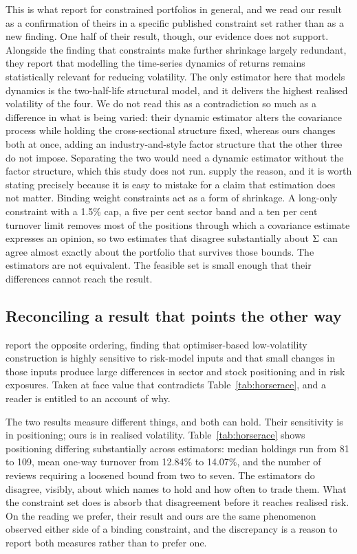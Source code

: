 This is what \citet{dom2025beyond} report for constrained portfolios in
general, and we read our result as a confirmation of theirs in a specific
published constraint set rather than as a new finding. One half of their
result, though, our evidence does not support. Alongside the finding that
constraints make further shrinkage largely redundant, they report that
modelling the time-series dynamics of returns remains statistically relevant
for reducing volatility. The only estimator here that models dynamics is the
two-half-life structural model, and it delivers the highest realised volatility
of the four. We do not read this as a contradiction so much as a difference in
what is being varied: their dynamic estimator alters the covariance process
while holding the cross-sectional structure fixed, whereas ours changes both at
once, adding an industry-and-style factor structure that the other three do not
impose. Separating the two would need a dynamic estimator without the factor
structure, which this study does not run.
\citet{jagannathan2003risk} supply the reason, and it is worth stating
precisely because it is easy to mistake for a claim that estimation does not
matter. Binding weight constraints act as a form of shrinkage. A long-only
constraint with a 1.5\% cap, a five per cent sector band and a ten per cent
turnover limit removes most of the positions through which a covariance
estimate expresses an opinion, so two estimates that disagree substantially
about $\Sigma$ can agree almost exactly about the portfolio that survives those
bounds. The estimators are not equivalent. The feasible set is small enough
that their differences cannot reach the result.

\subsection{Reconciling a result that points the other way}
\citet{alonso2020devil} report the opposite ordering, finding that
optimiser-based low-volatility construction is highly sensitive to risk-model
inputs and that small changes in those inputs produce large differences in
sector and stock positioning and in risk exposures. Taken at face value that
contradicts Table~\ref{tab:horserace}, and a reader is entitled to an account
of why.

The two results measure different things, and both can hold. Their sensitivity
is in positioning; ours is in realised volatility. Table~\ref{tab:horserace}
shows positioning differing substantially across estimators: median holdings
run from 81 to 109, mean one-way turnover from 12.84\% to 14.07\%, and the
number of reviews requiring a loosened bound from two to seven. The estimators
do disagree, visibly, about which names to hold and how often to trade them.
What the constraint set does is absorb that disagreement before it reaches
realised risk. On the reading we prefer, their result and ours are the same
phenomenon observed either side of a binding constraint, and the discrepancy is
a reason to report both measures rather than to prefer one.

